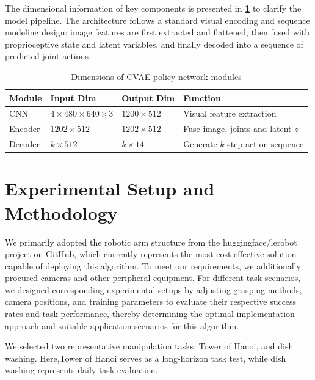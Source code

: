\documentclass[runningheads]{llncs}
\begin{document}
The dimensional information of key components is presented in \textbf{\cref{tab:dim_summary}} to clarify the model pipeline. The architecture follows a standard visual encoding and sequence modeling design: image features are first extracted and flattened, then fused with proprioceptive state and latent variables, and finally decoded into a sequence of predicted joint actions.

\begin{table}[htbp]
    \centering
    \caption{Dimensions of CVAE policy network modules}
    \label{tab:dim_summary}
    \begin{tabularx}{\textwidth}{@{}>{\hsize=0.5\hsize\centering\arraybackslash}X 
                                >{\hsize=1.0\hsize\centering\arraybackslash}X 
                                >{\hsize=0.8\hsize\centering\arraybackslash}X 
                                >{\hsize=1.7\hsize\centering\arraybackslash}X@{}}
        \toprule
        \textbf{Module} & \textbf{Input Dim} & \textbf{Output Dim} & \textbf{Function} \\
        \midrule
        CNN & $4 \times 480 \times 640 \times 3$ & $1200 \times 512$ & Visual feature extraction \\
        Encoder & $1202 \times 512$ & $1202 \times 512$ & Fuse image, joints and latent $z$ \\
        Decoder & $k \times 512$ & $k \times 14$ & Generate $k$-step action sequence \\
        \bottomrule
    \end{tabularx}
\end{table}

\section{Experimental Setup and Methodology}
We primarily adopted the robotic arm structure from the huggingface/lerobot project on GitHub, which currently represents the most cost-effective solution capable of deploying this algorithm. To meet our requirements, we additionally procured cameras and other peripheral equipment. For different task scenarios, we designed corresponding experimental setups by adjusting grasping methods, camera positions, and training parameters to evaluate their respective success rates and task performance, thereby determining the optimal implementation approach and suitable application scenarios for this algorithm.

We selected two representative manipulation tasks: Tower of Hanoi, and dish washing. Here,Tower of Hanoi serves as a long-horizon task test, while dish washing represents daily task evaluation.
\end{document}
